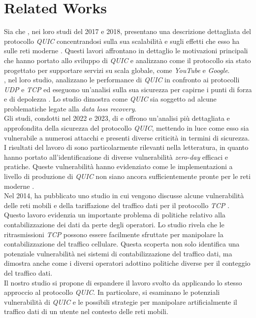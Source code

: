 \chapter{Related Works}
\label{cap:RelatedWorks}

Sia  che  , nei loro studi del 2017 e 2018, presentano una descrizione dettagliata
del protocollo \emph{QUIC} concentrandosi sulla sua scalabilità e sugli effetti che esso ha sulle reti moderne \cite{article:handshake,article:wild}.
Questi lavori affrontano in dettaglio le motivazioni principali che hanno portato allo sviluppo di \emph{QUIC} e analizzano come il protocollo sia stato progettato per 
supportare servizi su scala globale, come \emph{YouTube} e \emph{Google}. \\
, nel loro studio, analizzano le performance di \emph{QUIC} in confronto ai protocolli \emph{UDP} e \emph{TCP} ed eseguono un'analisi sulla sua sicurezza 
per capirne i punti di forza e di depolezza \cite{article:securityAnaP}. Lo studio dimostra come \emph{QUIC} sia soggetto ad alcune problematiche legate alla \emph{data loss recovery}.
\\
Gli studi, condotti nel 2022 e 2023, di \citeauthor{article:QuicAtt} e  offrono un'analisi più dettagliata e approfondita
della sicurezza del protocollo \emph{QUIC}, mettendo in luce come esso sia vulnerabile a numerosi attacchi e presenti diverse criticità in termini di sicurezza.
I risultati del lavoro di \citeauthor{article:QuicAtt} sono particolarmente rilevanti nella letteratura, in quanto hanno portato all'identificazione di diverse vulnerabilità \emph{zero-day} efficaci e pratiche.
Queste vulnerabilità hanno evidenziato come le implementazioni a livello di produzione di \emph{QUIC} non siano ancora sufficientemente pronte per le reti moderne \cite{article:QuicAtt,article:forge}.
\\
Nel 2014, \citeauthor{article:cellular} ha pubblicato uno studio in cui vengono discusse alcune vulnerabilità delle reti mobili e della tariffazione del traffico dati 
per il protocollo \emph{TCP} \cite{article:cellular}. Questo lavoro evidenzia un importante problema di politiche relativo alla contabilizzazione dei dati da perte degli operatori.
Lo studio rivela che le ritrasmissioni \emph{TCP} possono essere facilmente sfruttate per manipolare la contabilizzazione del traffico cellulare. 
Questa scoperta non solo identifica una potenziale vulnerabilità nei sistemi di contabilizzazione del traffico dati,
ma dimostra anche come i diversi operatori adottino politiche diverse per il conteggio del traffico dati.
\\
Il nostro studio si propone di espandere il lavoro svolto da \citeauthor{article:cellular} applicando lo stesso approccio al protocollo \emph{QUIC}. 
In particolare, si esaminano le potenziali vulnerabilità di \emph{QUIC} e le possibili strategie per manipolare artificialmente il traffico dati di un utente nel contesto delle reti mobili. 